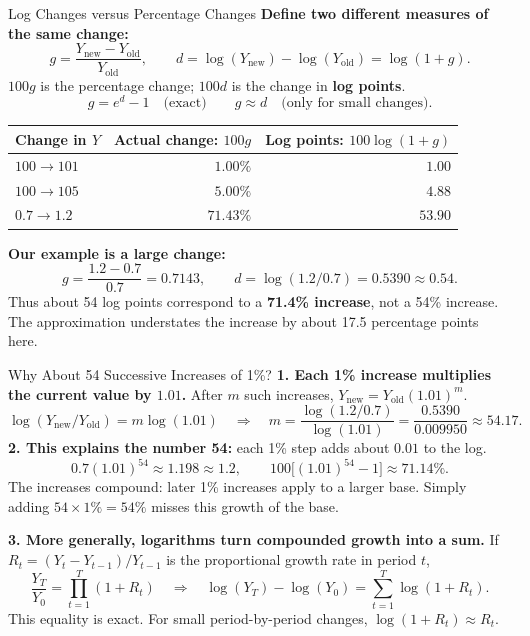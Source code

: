 \documentclass[notes,10pt, aspectratio=169]{beamer}
\begin{document}
\begin{frame}{Log Changes versus Percentage Changes}
\small
\textbf{Define two different measures of the same change:}
\[
g=\frac{Y_{\mathrm{new}}-Y_{\mathrm{old}}}{Y_{\mathrm{old}}},
\qquad d=\log(Y_{\mathrm{new}})-\log(Y_{\mathrm{old}})=\log(1+g).
\]
$100g$ is the percentage change; $100d$ is the change in \textbf{log points}.
\[
\boxed{g=e^d-1\quad\text{(exact)}}\qquad
\boxed{g\approx d\quad\text{(only for small changes)}}.
\]
\begin{center}
\begin{tabular}{lrr}
\toprule
Change in $Y$ & Actual change: $100g$ & Log points: $100\log(1+g)$\\
\midrule
$100\to101$ & $1.00\%$ & $1.00$\\
$100\to105$ & $5.00\%$ & $4.88$\\
$0.7\to1.2$ & $71.43\%$ & $53.90$\\
\bottomrule
\end{tabular}
\end{center}
\textbf{Our example is a large change:}
\[
g=\frac{1.2-0.7}{0.7}=0.7143,
\qquad d=\log(1.2/0.7)=0.5390\approx0.54.
\]
Thus about 54 log points correspond to a \textbf{71.4\% increase}, not a 54\% increase.\\
The approximation understates the increase by about 17.5 percentage points here.
\end{frame}

\begin{frame}{Why About 54 Successive Increases of 1\%?}
\small
\textbf{1. Each 1\% increase multiplies the current value by $1.01$.}
After $m$ such increases, $Y_{\mathrm{new}}=Y_{\mathrm{old}}(1.01)^m$.
\[
\log(Y_{\mathrm{new}}/Y_{\mathrm{old}})=m\log(1.01)
\quad\Rightarrow\quad
m=\frac{\log(1.2/0.7)}{\log(1.01)}
=\frac{0.5390}{0.009950}\approx54.17.
\]
\textbf{2. This explains the number 54:} each 1\% step adds about $0.01$ to the log.
\[
0.7(1.01)^{54}\approx1.198\approx1.2,
\qquad 100\big[(1.01)^{54}-1\big]\approx71.14\%.
\]
The increases compound: later 1\% increases apply to a larger base. Simply adding
$54\times1\%=54\%$ misses this growth of the base.
\medskip

\textbf{3. More generally, logarithms turn compounded growth into a sum.}
If $R_t=(Y_t-Y_{t-1})/Y_{t-1}$ is the proportional growth rate in period $t$,
\[
\frac{Y_T}{Y_0}=\prod_{t=1}^{T}(1+R_t)
\quad\Rightarrow\quad
\log(Y_T)-\log(Y_0)=\sum_{t=1}^{T}\log(1+R_t).
\]
This equality is exact. For small period-by-period changes, $\log(1+R_t)\approx R_t$.
\end{frame}
\end{document}
